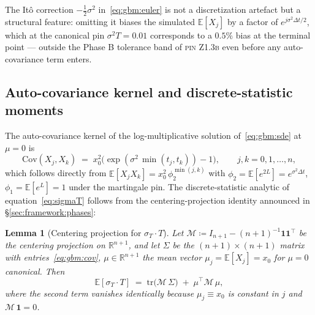 \documentclass[11pt,letterpaper]{article}
\newtheorem{lemma}{Lemma}[section]
\newcommand{\E}{\mathbb{E}}
\newcommand{\Cov}{\text{Cov}}
\newcommand{\R}{\mathbb{R}}
\newcommand{\sigmaT}{\sigma_{T}}
\newcommand{\centerProj}{\mathcal{M}}
\newcommand{\PinZ}[1]{\textsc{pin Z1.#1}}
\begin{document}
The Itô correction $-\tfrac{1}{2}\sigma^{2}$ in~\eqref{eq:gbm:euler} is
not a discretization artefact but a structural feature: omitting it
biases the simulated $\E[X_{j}]$ by a factor of $e^{j\sigma^{2}\Delta t / 2}$,
which at the canonical pin $\sigma^{2}T = 0.01$ corresponds to a $0.5\%$
bias at the terminal point — outside the Phase B tolerance band of
\PinZ{3b} even before any auto-covariance term enters.

\subsection{Auto-covariance kernel and discrete-statistic moments}
\label{sec:gbm:autocov}

The auto-covariance kernel of the log-multiplicative solution
of~\eqref{eq:gbm:sde} at $\mu = 0$ is
\begin{equation}
    \Cov(X_{j}, X_{k})
    \;=\;
    x_{0}^{2}\bigl(\exp(\sigma^{2}\,\min(t_{j}, t_{k})) - 1\bigr),
    \qquad j, k = 0, 1, \dots, n,
    \label{eq:gbm:cov}
\end{equation}
which follows directly from $\E[X_{j}X_{k}] = x_{0}^{2}\,\phi_{2}^{\min(j,k)}$
with $\phi_{2} = \E[e^{2L}] = e^{\sigma^{2}\Delta t}$, $\phi_{1} = \E[e^{L}] = 1$
under the martingale pin. The discrete-statistic
analytic of equation~\eqref{eq:sigmaT} follows from the centering-projection
identity announced in \S\ref{sec:framework:phases}:

\begin{lemma}[Centering projection for $\sigmaT \cdot T$]
\label{lem:gbm:proj}
Let $\centerProj \coloneqq I_{n+1} - (n+1)^{-1}\mathbf{1}\mathbf{1}^{\top}$
be the centering projection on $\R^{n+1}$, and let $\Sigma$ be the
$(n+1)\times(n+1)$ matrix with entries~\eqref{eq:gbm:cov}, $\mu \in \R^{n+1}$
the mean vector $\mu_{j} = \E[X_{j}] = x_{0}$ for $\mu = 0$ canonical.
Then
\begin{equation}
    \E[\sigmaT \cdot T]
    \;=\;
    \mathrm{tr}\bigl(\centerProj\,\Sigma\bigr)
    \;+\; \mu^{\top}\centerProj\,\mu,
    \label{eq:gbm:trace-id}
\end{equation}
where the second term vanishes identically because
$\mu_{j} \equiv x_{0}$ is constant in $j$ and $\centerProj\,\mathbf{1} = 0$.
\end{lemma}
\end{document}
